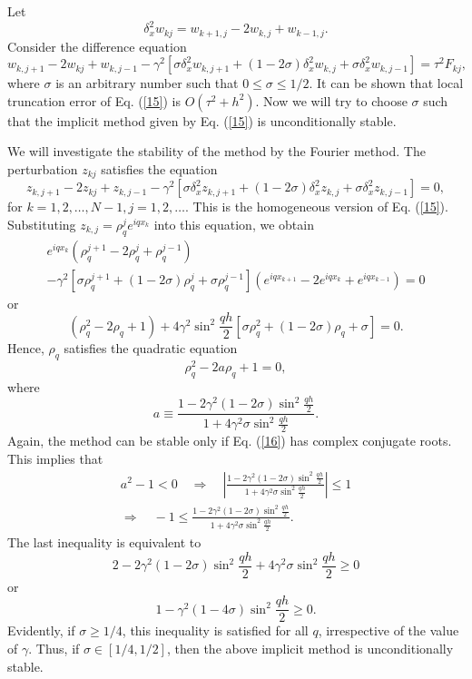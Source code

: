     Let
\[
\delta_{x}^2 w_{kj}=w_{k+1,j}-2w_{k,j}+w_{k-1,j}.
\]
Consider the difference equation
\begin{equation}
w_{k,j+1}-2w_{kj}+w_{k,j-1}-\gamma^{2} \left[\sigma \delta_{x}^2
w_{k,j+1}+(1-2\sigma)\delta_{x}^2 w_{k,j} +\sigma \delta_{x}^2
w_{k,j-1}\right]=\tau^2 F_{kj}, \label{15}
\end{equation}
where $\sigma$ is an arbitrary number such that $0\leq \sigma\leq
1/2$. It can be shown that local truncation error of Eq.
(\ref{15}) is $O(\tau^{2}+h^{2})$. Now we will try to choose
$\sigma$ such that the implicit method given by Eq. (\ref{15}) is
unconditionally stable.

    We will investigate the stability of the
method by the Fourier method. The perturbation
$z_{kj}$ satisfies the equation
\[
z_{k,j+1}-2z_{kj}+z_{k,j-1}-\gamma^{2} \left[\sigma \delta_{x}^2
z_{k,j+1}+(1-2\sigma)\delta_{x}^2 z_{k,j} +\sigma \delta_{x}^2
z_{k,j-1}\right]=0, 
\]
for  $k=1,2, \dots, N-1, j=1,2, \dots$.
This is the homogeneous version of Eq. (\ref{15}). Substituting
$z_{k,j}=\rho_{q}^{j}e^{iqx_{k}}$ into this equation, we obtain
\begin{multline*}
e^{iqx_{k}}\left(\rho_{q}^{j+1}-2\rho_{q}^{j}+\rho_{q}^{j-1}\right)\\-
\gamma^{2}\left[\sigma\rho_{q}^{j+1}+(1-2\sigma)\rho_{q}^{j}+\sigma\rho_{q}^{j-1}\right]
\left(e^{iqx_{k+1}}-2e^{iqx_{k}}+e^{iqx_{k-1}}\right)=0
\end{multline*}
or
\[
\left(\rho_{q}^{2}-2\rho_{q}+1\right)+
4\gamma^{2}\sin^{2}\frac{qh}{2}\left[\sigma\rho_{q}^{2}+(1-2\sigma)\rho_{q}+\sigma\right]=0.
\]
Hence, $\rho_{q}$ satisfies the quadratic equation
\begin{equation}
\rho_{q}^{2}-2a\rho_{q}+1=0, \label{16}
\end{equation}
where
\[
a\equiv
\frac{1-2\gamma^{2}(1-2\sigma)\sin^{2}\frac{qh}{2}}{1+4\gamma^{2}\sigma\sin^{2}\frac{qh}{2}}.
\]
Again, the method can be stable only if Eq. (\ref{16}) has complex
conjugate roots. This implies that
\begin{multline*}
a^{2}-1<0 \quad \Rightarrow \quad \left\vert
\frac{1-2\gamma^{2}(1-2\sigma)\sin^{2}\frac{qh}{2}}{1+4\gamma^{2}\sigma\sin^{2}\frac{qh}{2}}
\right\vert \leq 1 \\ 
\Rightarrow \quad -1\leq
\frac{1-2\gamma^{2}(1-2\sigma)\sin^{2}\frac{qh}{2}}{1+4\gamma^{2}\sigma\sin^{2}\frac{qh}{2}}.
\end{multline*}
The last inequality is equivalent to
\[
2-2\gamma^{2}(1-2\sigma)\sin^{2}\frac{qh}{2}+4\gamma^{2}\sigma\sin^{2}\frac{qh}{2}\geq
0
\]
or
\[
1-\gamma^{2}(1-4\sigma)\sin^{2}\frac{qh}{2}\geq 0.
\]
Evidently, if $\sigma \geq 1/4$, this inequality is satisfied for
all $q$, irrespective of the value of $\gamma$. Thus, if
$\sigma\in[1/4,1/2]$, then the above implicit method is
unconditionally stable.



